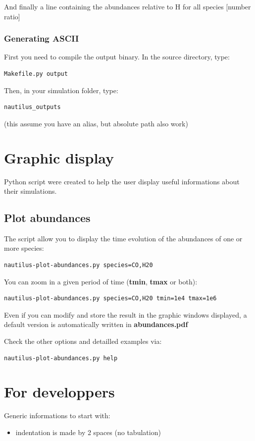 \documentclass[english,a4paper,twoside]{article}
\begin{document}
And finally a line containing the abundances relative to H for all species [number ratio]

\subsubsection{Generating ASCII}
First you need to compile the output binary. In the source directory, type:
\begin{verbatim}
Makefile.py output
\end{verbatim}

Then, in your simulation folder, type:
\begin{verbatim}
nautilus_outputs
\end{verbatim}
(this assume you have an alias, but absolute path also work)

\section{Graphic display}
Python script were created to help the user display useful informations about their simulations. 

\subsection{Plot abundances}
The script  allow you to display the time evolution of the abundances of one or more species:
\begin{verbatim}
nautilus-plot-abundances.py species=CO,H20
\end{verbatim}

You can zoom in a given period of time (\textbf{tmin}, \textbf{tmax} or both):
\begin{verbatim}
nautilus-plot-abundances.py species=CO,H20 tmin=1e4 tmax=1e6
\end{verbatim}

Even if you can modify and store the result in the graphic windows displayed, a default version is automatically written in \textbf{abundances.pdf} 

Check the other options and detailled examples via:
\begin{verbatim}
nautilus-plot-abundances.py help
\end{verbatim}

\section{For developpers}
Generic informations to start with:
\begin{itemize}
\item indentation is made by 2 spaces (no tabulation)
\end{itemize}
\end{document}
